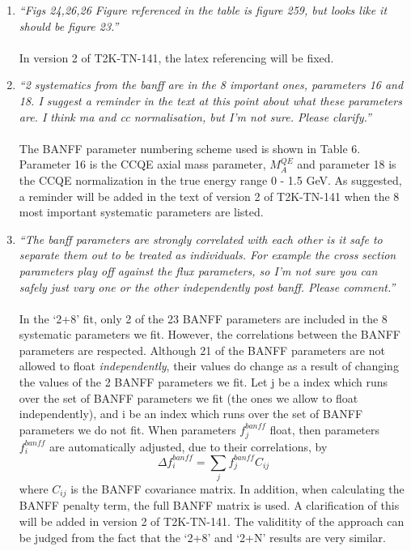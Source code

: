 \begin{enumerate}
\vspace{5 mm}
\item
{\em
  ``Figs 24,26,26 Figure referenced in the table is figure 259, but looks like it should be figure 23.''
}\\
\\
In version 2 of T2K-TN-141, the latex referencing will be fixed.

\vspace{5 mm}
\item
{\em
  ``2 systematics from the banff are in the 8 important ones, parameters 16 and 18. 
  I suggest a reminder in the text at this point about what these parameters are. 
  I think ma and cc normalisation, but I'm not sure. Please clarify.''
}\\
\\
The BANFF parameter numbering scheme used is shown in Table 6.
Parameter 16 is the CCQE axial mass parameter, $M_{A}^{QE}$ and 
parameter 18 is the CCQE normalization in the true energy range 0 - 1.5 GeV.
As suggested, 
a reminder will be added in the text of version 2 of T2K-TN-141 when the 8 most important systematic
parameters are listed.

\vspace{5 mm}
\item
{\em
  ``The banff parameters are strongly correlated with each other is it safe to separate 
  them out to be treated as individuals.
  For example the cross section parameters play off against the flux parameters, 
  so I'm not sure you can safely just vary one or the other independently post banff. 
  Please comment.''
}\\
\\
In the `2+8' fit, only 2 of the 23 BANFF parameters are included in the 8 systematic
parameters we fit. However, the correlations between the BANFF parameters are respected.
Although 21 of the BANFF parameters are not allowed to float {\em independently},
their values do change as a result of changing the values of the 2 BANFF parameters we fit.
Let j be a index which runs over the set of BANFF parameters we fit (the ones we allow to 
float independently), and i be an index which runs over the set of BANFF parameters we do not fit.
When parameters $f^{banff}_j$ float, then parameters $f^{banff}_i$ are automatically adjusted,
due to their correlations, by
\begin{equation} \nonumber
\Delta f^{banff}_i = \sum_j f^{banff}_j C_{ij}
\end{equation}
where $C_{ij}$ is the BANFF covariance matrix.
In addition, when calculating the BANFF penalty term, the full BANFF matrix is used.
A clarification of this will be added in version 2 of T2K-TN-141.
The validitity of the approach can be judged from the fact that the `2+8' and `2+N'
results are very similar.


\end{enumerate}
